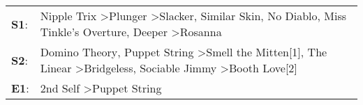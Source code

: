 \begin{supertabular}{p{0.03\textwidth}p{0.92\textwidth}}
 \textbf{S1}:  &  Nipple Trix\textsuperscript{} \textgreater \enspace Plunger\textsuperscript{} \textgreater \enspace Slacker\textsuperscript{}, \enspace Similar Skin\textsuperscript{}, \enspace No Diablo\textsuperscript{}, \enspace Miss Tinkle's Overture\textsuperscript{}, \enspace Deeper\textsuperscript{} \textgreater \enspace Rosanna\textsuperscript{}  \enspace  \\
 \textbf{S2}:  &                    Domino Theory\textsuperscript{}, \enspace Puppet String\textsuperscript{} \textgreater \enspace Smell the Mitten[1]\textsuperscript{}, \enspace The Linear\textsuperscript{} \textgreater \enspace Bridgeless\textsuperscript{}, \enspace Sociable Jimmy\textsuperscript{} \textgreater \enspace Booth Love[2]\textsuperscript{}  \enspace  \\
 \textbf{E1}:  &                                                                                                                                                                                                                                                                    2nd Self\textsuperscript{} \textgreater \enspace Puppet String\textsuperscript{}  \enspace  \\
\end{supertabular}
